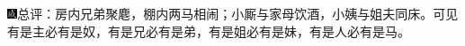 {\includegraphics[width=3mm]{../Images/00005}\kaishu        总评：房内兄弟聚}麀{，棚内两马相闹；小厮与家母饮酒，小姨与姐夫同床。可见有是主必有是奴，有是兄必有是弟，有是姐必有是妹，有是人必有是马。}


